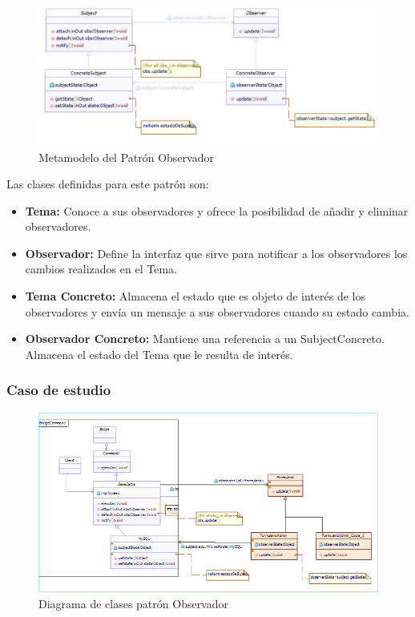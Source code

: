 \begin{figure}[th!]
	\centering
	\includegraphics[width=0.8\linewidth]{arquitectura/imagenes/modeloObservador}
	\caption{Metamodelo del Patrón Observador}
	\label{fig:metamodelo patron observador}
\end{figure}

Las clases definidas para este patrón son:

\begin{itemize}
	\item \textbf{Tema: }Conoce a sus observadores y ofrece la posibilidad de añadir y eliminar observadores.
	\item \textbf{Observador: }Define la interfaz que sirve para notificar a los observadores los cambios realizados en el Tema.
	\item \textbf{Tema Concreto: }Almacena el estado que es objeto de interés de los observadores y envía un mensaje a sus observadores cuando su estado cambia.
	\item \textbf{Observador Concreto: }Mantiene una referencia a un SubjectConcreto. Almacena el estado del Tema que le resulta de interés.
\end{itemize}



\subsubsection{Caso de estudio}
	\begin{figure}[h!]
	\centering
	\includegraphics[width=1.0\linewidth]{arquitectura/imagenes/DiagramaObservador}
	\caption{Diagrama de clases patrón Observador}
\end{figure}




